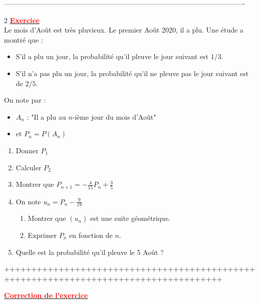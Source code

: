 \documentclass[12pt,a4paper]{article}
\begin{document}
-------------------------------------------------------------------------------------------------------
\newpage
\begin{multicols}{2}
\setlength{\columnseprule}{0.1mm} %
\underline{\textbf{\textcolor{red}{Exercice}}}\\

Le mois d'Août est très pluvieux. Le premier Août 2020, il a plu. Une étude a montré que :
\begin{itemize}
    \item S'il a plu un jour, la probabilité qu'il pleuve le jour suivant est $1/3$.
    \item S'il n'a pas plu un jour, la probabilité qu'il ne pleuve pas le jour suivant est de $2/5$.
\end{itemize}

On note par :
\begin{itemize}
    \item $A_n$ : "Il a plu au $n$-ième jour du mois d'Août"
    \item et $P_n = P(A_n)$
\end{itemize}

\begin{enumerate}
    \item Donner $P_1$
    \item Calculer $P_2$
    \item Montrer que $P_{n+1} = -\frac{4}{15} P_n + \frac{3}{5}$
    \item On note $u_n = P_n - \frac{9}{19}$
    \begin{enumerate}
        \item Montrer que $(u_n)$ est une suite géométrique.
        \item Exprimer $P_n$ en fonction de $n$.
    \end{enumerate}
    \item Quelle est la probabilité qu'il pleuve le 5 Août ?
\end{enumerate}
\end{multicols}
++++++++++++++++++++++++++++++++++++++++++++++++++++++++++++++++++++++++++++++++++++++

\underline{\textbf{\textcolor{red}{Correction de l'exercice}}}\\
\end{document}
